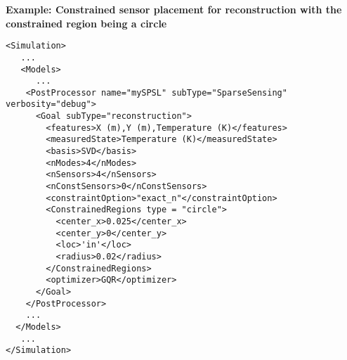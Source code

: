 \textbf{Example: Constrained sensor placement for reconstruction with the constrained region being a circle}
\begin{lstlisting}[style=XML]
<Simulation>
   ...
   <Models>
      ...
    <PostProcessor name="mySPSL" subType="SparseSensing" verbosity="debug">
      <Goal subType="reconstruction">
        <features>X (m),Y (m),Temperature (K)</features>
        <measuredState>Temperature (K)</measuredState>
        <basis>SVD</basis>
        <nModes>4</nModes>
        <nSensors>4</nSensors>
        <nConstSensors>0</nConstSensors>
        <constraintOption>"exact_n"</constraintOption>
        <ConstrainedRegions type = "circle"> 
          <center_x>0.025</center_x>
          <center_y>0</center_y>
          <loc>'in'</loc>
          <radius>0.02</radius>
        </ConstrainedRegions>
        <optimizer>GQR</optimizer>
      </Goal>
    </PostProcessor>
    ...
  </Models>
   ...
</Simulation>
\end{lstlisting}

